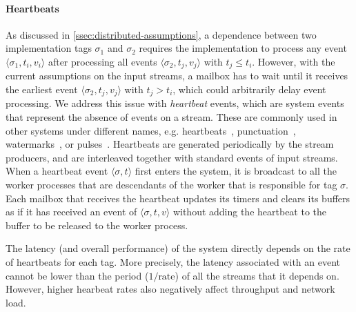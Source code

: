 \paragraph{Heartbeats}
\label{ssec:heartbeats}
As discussed in \cref{ssec:distributed-assumptions}, a dependence
between two implementation tags $\sigma_1$ and $\sigma_2$ requires the
implementation to process any event $\langle \sigma_1, t_i, v_i
\rangle$ after processing all events $\langle \sigma_2, t_j, v_j
\rangle$ with $t_j \leq t_i$. However, with the current assumptions on
the input streams, a mailbox has to wait until it receives the
earliest event $\langle \sigma_2, t_j, v_j \rangle$ with $t_j > t_i$,
which could arbitrarily delay event processing. We address this issue
with \emph{heartbeat} events, which are system events that represent
the absence of events on a stream.  These are commonly used in other
systems under different names, e.g.  heartbeats~\cite{heartbeats2005},
punctuation~\cite{punctuation2003},
watermarks~\cite{carbone2015flink}, or
pulses~\cite{schneider2015safeparallelism}.
Heartbeats are generated
periodically by the stream producers, and are interleaved together
with standard events of input streams.  When a heartbeat event
$\langle \sigma, t \rangle$ first enters the system, it is broadcast
to all the worker processes that are descendants of the worker that is
responsible for tag $\sigma$.  Each mailbox that receives the
heartbeat updates its timers and clears its buffers as if it has
received an event of $\langle \sigma, t, v \rangle$ without adding the
heartbeat to the buffer to be released to the worker process.

The latency (and overall performance) of the system directly depends on the rate of heartbeats for each tag.
More precisely, the latency associated with an event cannot be lower than the period ($1/{\text{rate}}$) of all the streams that it depends on. However,
higher hearbeat rates also negatively affect throughput and network load.

